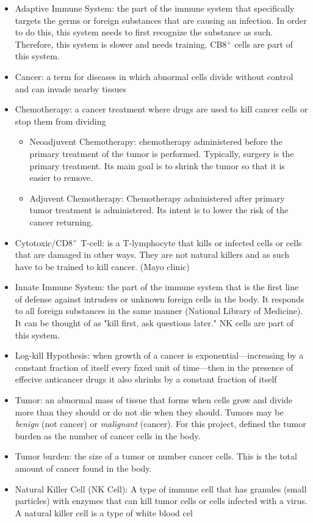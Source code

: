\documentclass[11pt]{amsart}
\begin{document}
\begin{itemize}
	\item Adaptive Immune System: the part of the immune system that specifically targets the germs or foreign substances that are causing an infection. In order to do this, this system needs to first recognize the substance as such. Therefore, this system is slower and needs training. CB8$^+$ cells are part of this system.
	\item Cancer:  a term for diseases in which abnormal cells divide without control and can invade nearby tissues
	\item Chemotherapy: a cancer treatment where drugs are used to kill cancer cells or stop them from dividing
		\begin{itemize}
			\item Neoadjuvent Chemotherapy: chemotherapy administered before the primary treatment of the tumor is performed. Typically, surgery is the primary treatment. Its main goal is to shrink the tumor so that it is easier to remove.
			\item Adjuvent Chemotherapy: Chemotherapy administered after primary tumor treatment is administered. Its intent is to lower the risk of the cancer returning.
		\end{itemize}
	\item Cytotoxic/CD8$^+$ T-cell: is a T-lymphocyte that kills or infected cells or cells that are damaged in other ways. They are not natural killers and as such have to be trained to kill cancer. (Mayo clinic)
	\item Innate Immune System: the part of the immune system that is the first line of defense against intruders or unknown foreign cells in the body. It responds to all foreign substances in the same manner (National Library of Medicine). It can be thought of as "kill first, ask questions later." NK cells are part of this system.
	\item Log-kill Hypothesis: when growth of a cancer is exponential—increasing by a constant fraction of itself every fıxed unit of time—then in the presence of effecive anticancer drugs it also shrinks by a constant fraction \cite{LogKill}
of itself
	\item Tumor: an abnormal mass of tissue that forms when cells grow and divide more than they should or do not die when they should. Tumors may be \textit{benign} (not cancer) or \textit{malignant} (cancer). For this project, defined the tumor burden as the number of cancer cells in the body.
	\item Tumor burden: the size of a tumor or number cancer cells. This is the total amount of cancer found in the body.
        \item Natural Killer Cell (NK Cell): A type of immune cell that has granules (small particles) with enzymes that can kill tumor cells or cells infected with a virus. A natural killer cell is a type of white blood cel
\end{itemize}
\end{document}
